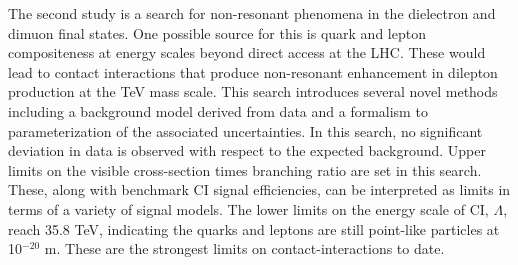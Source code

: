 The second study is a search for non-resonant phenomena in the dielectron and dimuon final states.
One possible source for this is quark and lepton compositeness at energy scales beyond direct access at the LHC.
These would lead to contact interactions that produce non-resonant enhancement in dilepton production at the TeV mass scale.
This search introduces several novel methods including a background model derived from data and a formalism to parameterization of the associated uncertainties.
In this search, no significant deviation in data is observed with respect to the expected background.
Upper limits on the visible cross-section times branching ratio are set in this search.
These, along with benchmark CI signal efficiencies, can be interpreted as limits in terms of a variety of signal models.
The lower limits on the energy scale of CI, $\Lambda$, reach 35.8 TeV, indicating the quarks and leptons are still point-like particles at 10$^{-20}$ m.
These are the strongest limits on \qqll contact-interactions to date.

